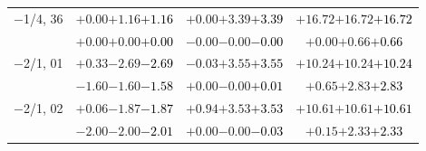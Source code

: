 \documentclass[compress]{beamer}
\begin{document}
\begin{frame}
\begin{tabular}{r | c | c | c}
$-$1/4, 36 & $+0.00$\hspace{0.1 cm}$+1.16$\hspace{0.1 cm}\textcolor{black}{$+1.16$} & $+0.00$\hspace{0.1 cm}$+3.39$\hspace{0.1 cm}\textcolor{black}{$+3.39$} & $+16.72$\hspace{0.1 cm}$+16.72$\hspace{0.1 cm}\textcolor{black}{$+16.72$} \\
           & $+0.00$\hspace{0.1 cm}$+0.00$\hspace{0.1 cm}\textcolor{black}{$+0.00$} & $-0.00$\hspace{0.1 cm}$-0.00$\hspace{0.1 cm}\textcolor{black}{$-0.00$} & $+0.00$\hspace{0.1 cm}$+0.66$\hspace{0.1 cm}\textcolor{black}{$+0.66$} \\
$-$2/1, 01 & $+0.33$\hspace{0.1 cm}$-2.69$\hspace{0.1 cm}\textcolor{black}{$-2.69$} & $-0.03$\hspace{0.1 cm}$+3.55$\hspace{0.1 cm}\textcolor{black}{$+3.55$} & $+10.24$\hspace{0.1 cm}$+10.24$\hspace{0.1 cm}\textcolor{black}{$+10.24$} \\
           & $-1.60$\hspace{0.1 cm}$-1.60$\hspace{0.1 cm}\textcolor{black}{$-1.58$} & $+0.00$\hspace{0.1 cm}$-0.00$\hspace{0.1 cm}\textcolor{black}{$+0.01$} & $+0.65$\hspace{0.1 cm}$+2.83$\hspace{0.1 cm}\textcolor{black}{$+2.83$} \\
$-$2/1, 02 & $+0.06$\hspace{0.1 cm}$-1.87$\hspace{0.1 cm}\textcolor{black}{$-1.87$} & $+0.94$\hspace{0.1 cm}$+3.53$\hspace{0.1 cm}\textcolor{black}{$+3.53$} & $+10.61$\hspace{0.1 cm}$+10.61$\hspace{0.1 cm}\textcolor{black}{$+10.61$} \\
           & $-2.00$\hspace{0.1 cm}$-2.00$\hspace{0.1 cm}\textcolor{black}{$-2.01$} & $+0.00$\hspace{0.1 cm}$-0.00$\hspace{0.1 cm}\textcolor{black}{$-0.03$} & $+0.15$\hspace{0.1 cm}$+2.33$\hspace{0.1 cm}\textcolor{black}{$+2.33$} \\

\end{tabular}
\end{frame}
\end{document}
